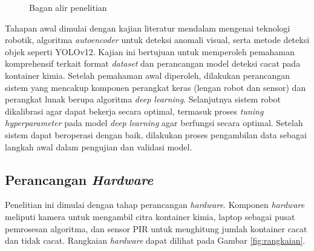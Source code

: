 \begin{figure}[H]
  \caption{Bagan alir penelitian}
  \label{fig:bagan-umum}
\end{figure}
\vspace{-1em}

Tahapan awal dimulai dengan kajian literatur mendalam mengenai
teknologi robotik, algoritma \textit{autoencoder} untuk deteksi anomali
visual, serta metode deteksi objek seperti YOLOv12. Kajian ini bertujuan
untuk memperoleh pemahaman komprehensif terkait format
\textit{dataset} dan perancangan model deteksi cacat pada kontainer
kimia. Setelah
pemahaman awal diperoleh, dilakukan perancangan sistem yang mencakup
komponen perangkat keras (lengan robot dan sensor) dan perangkat
lunak berupa algoritma \textit{deep learning}. Selanjutnya sistem
robot dikalibrasi agar dapat bekerja secara optimal, termasuk proses
\textit{tuning hyperparameter} pada model \textit{deep learning}
agar berfungsi secara
optimal. Setelah sistem dapat beroperasi dengan baik, dilakukan proses
pengambilan data sebagai langkah awal dalam pengujian dan validasi model.

\vspace{1em}

\subsection{Perancangan \textit{Hardware}}
\noindent
Penelitian ini dimulai dengan tahap perancangan \textit{hardware}.
Komponen \textit{hardware} meliputi kamera untuk mengambil citra
kontainer kimia, laptop sebagai pusat pemrosesan algoritma, dan
sensor PIR untuk menghitung jumlah kontainer cacat dan tidak cacat.
Rangkaian \textit{hardware} dapat dilihat pada Gambar \ref{fig:rangkaian}.

